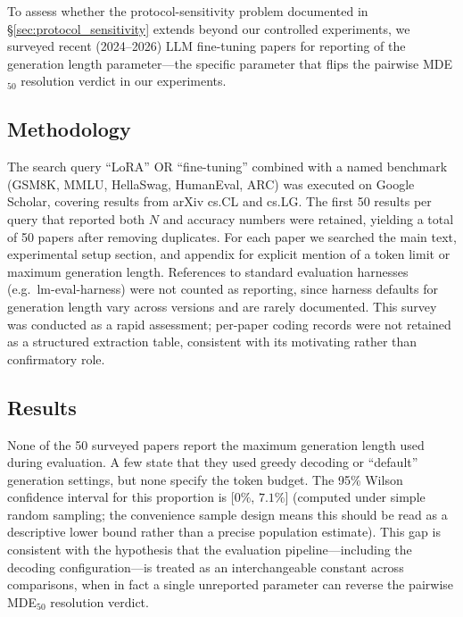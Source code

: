 \documentclass[pdflatex,sn-mathphys-ay,iicol]{sn-jnl}
\theoremstyle{thmstylethree}
\begin{document}
\begin{table}[t]
To assess whether the protocol-sensitivity problem documented in \S\ref{sec:protocol_sensitivity} extends beyond our controlled experiments, we surveyed recent (2024--2026) LLM fine-tuning papers for reporting of the generation length parameter---the specific parameter that flips the pairwise MDE$_{50}$ resolution verdict in our experiments.

\subsection{Methodology}

The search query ``LoRA'' OR ``fine-tuning'' combined with a named benchmark (GSM8K, MMLU, HellaSwag, HumanEval, ARC) was executed on Google Scholar, covering results from arXiv cs.CL and cs.LG. The first 50 results per query that reported both $N$ and accuracy numbers were retained, yielding a total of 50 papers after removing duplicates. For each paper we searched the main text, experimental setup section, and appendix for explicit mention of a token limit or maximum generation length. References to standard evaluation harnesses (e.g.\ lm-eval-harness) were not counted as reporting, since harness defaults for generation length vary across versions and are rarely documented. This survey was conducted as a rapid assessment; per-paper coding records were not retained as a structured extraction table, consistent with its motivating rather than confirmatory role.

\subsection{Results}

None of the 50 surveyed papers report the maximum generation length used during evaluation. A few state that they used greedy decoding or ``default'' generation settings, but none specify the token budget. The 95\% Wilson confidence interval for this proportion is [$0\%$, $7.1\%$] (computed under simple random sampling; the convenience sample design means this should be read as a descriptive lower bound rather than a precise population estimate). This gap is consistent with the hypothesis that the evaluation pipeline---including the decoding configuration---is treated as an interchangeable constant across comparisons, when in fact a single unreported parameter can reverse the pairwise MDE$_{50}$ resolution verdict.



\end{table}
\end{document}
